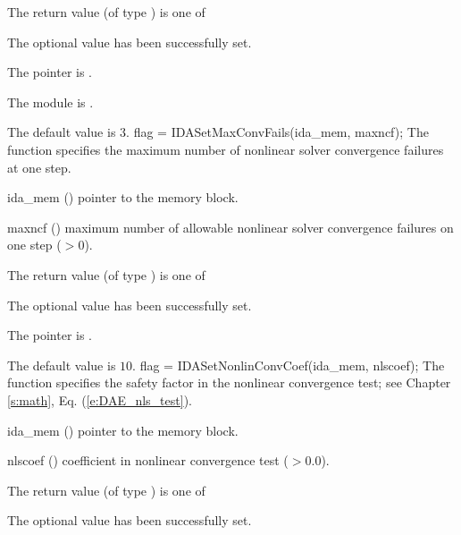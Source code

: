 {{\begin{args}
  \end{args}
}
{
  The return value  (of type ) is one of
  \begin{args}
  \item[\Id{IDA\_SUCCESS}]
    The optional value has been successfully set.
  \item[\Id{IDA\_MEM\_NULL}]
    The  pointer is .
  \item[\Id{IDA\_MEM\_FAIL}]
    The {\sunnonlinsol} module is .
  \end{args}
}
{
  The default value is $3$.
}
{
flag = IDASetMaxConvFails(ida\_mem, maxncf);
}
{
  The function  specifies the
  maximum number of nonlinear solver convergence failures at one step.
}
{
  \begin{args}
  \item[ida\_mem] ()
    pointer to the {\ida} memory block.
  \item[maxncf] ()
    maximum number of allowable nonlinear solver convergence failures
    on one step ($>0$).
  \end{args}
}
{
  The return value  (of type ) is one of
  \begin{args}
  \item[\Id{IDA\_SUCCESS}]
    The optional value has been successfully set.
  \item[\Id{IDA\_MEM\_NULL}]
    The  pointer is .
  \end{args}
}
{
  The default value is $10$.
}
{
flag = IDASetNonlinConvCoef(ida\_mem, nlscoef);
}
{
  The function  specifies the safety factor
  in the nonlinear convergence test;
  see Chapter \ref{s:math}, Eq. (\ref{e:DAE_nls_test}).
}
{
  \begin{args}
  \item[ida\_mem] ()
    pointer to the {\ida} memory block.
  \item[nlscoef] ()
    coefficient in nonlinear convergence test ($>0.0$).
  \end{args}
}
{
  The return value  (of type ) is one of
  \begin{args}
  \item[\Id{IDA\_SUCCESS}]
    The optional value has been successfully set.
  \item[\Id{IDA\_MEM\_NULL}]

\end{args}}}
